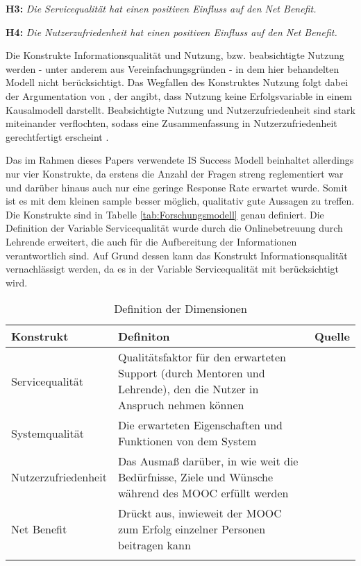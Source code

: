 \textbf{H3:} \textit{Die Servicequalität hat einen positiven Einfluss auf den Net Benefit.} 


\textbf{H4:} \textit{Die Nutzerzufriedenheit hat einen positiven Einfluss auf den Net Benefit.} \medskip


Die Konstrukte Informationsqualität und Nutzung, bzw. beabsichtigte Nutzung werden - unter anderem aus Vereinfachungsgründen - in dem hier behandelten Modell nicht berücksichtigt. Das Wegfallen des Konstruktes Nutzung folgt dabei der Argumentation von \textcite{seddon1997respecification}, der angibt, dass Nutzung keine Erfolgsvariable in einem Kausalmodell darstellt. Beabsichtigte Nutzung und Nutzerzufriedenheit sind stark miteinander verflochten, sodass eine Zusammenfassung in Nutzerzufriedenheit gerechtfertigt erscheint \parencite[vgl.][S.2970]{delone2002information}. 


Das im Rahmen dieses Papers verwendete IS Success Modell beinhaltet allerdings nur vier Konstrukte, da erstens die Anzahl der Fragen streng reglementiert war und darüber hinaus auch nur eine geringe Response Rate erwartet wurde. Somit ist es mit dem kleinen sample besser möglich, qualitativ gute Aussagen zu treffen. Die Konstrukte sind in Tabelle \ref{tab:Forschungsmodell} genau definiert. Die Definition der Variable Servicequalität wurde durch die Onlinebetreuung durch Lehrende erweitert, die auch für die Aufbereitung der Informationen verantwortlich sind. Auf Grund dessen kann das Konstrukt Informationsqualität vernachlässigt werden, da es in der Variable Servicequalität mit berücksichtigt wird.

\begin{table}[ht] 
\footnotesize
\caption{Definition der Dimensionen}
\label{tab:Dimensionen} 
\begin{tabular}{@{}lp{9cm}l@{}} \toprule

\textbf{Konstrukt} & \textbf{Definiton} & \textbf{Quelle} \\ \midrule


Servicequalität 	& Qualitätsfaktor für den erwarteten Support (durch Mentoren und Lehrende), den die Nutzer in Anspruch nehmen können & \parbox[t]{4cm}{\cite{petter2008measuring}}\\ 

Systemqualität 		& Die erwarteten Eigenschaften und Funktionen von dem System & \parbox[t]{4cm}{\cite{petter2008measuring}}\\ 

Nutzerzufriedenheit & Das Ausmaß darüber, in wie weit die Bedürfnisse, Ziele und Wünsche während des MOOC erfüllt werden & \parbox[t]{4cm}{\cite{sanchez2009moderating}}\\ 

Net Benefit 		& Drückt aus, inwieweit der MOOC zum Erfolg einzelner Personen beitragen kann  & \parbox[t]{4cm}{\cite{conf/gi/GemlikNSB10} \cite{Petter:0aa} }\\ \addlinespace 
  \bottomrule

\end{tabular}	
\end{table}


